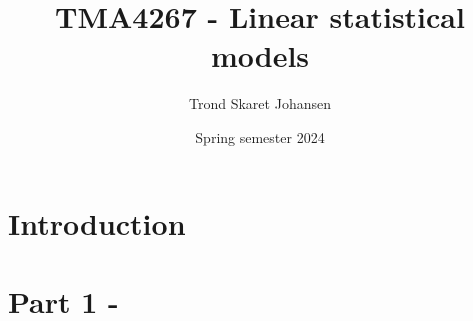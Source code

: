 \documentclass[12pt, letterpaper]{article}
\title{TMA4267 - Linear statistical models}
\date{Spring semester 2024}
\author{Trond Skaret Johansen}
\begin{document}
\maketitle
\tableofcontents
\newpage

\section{Introduction} 

\label{sec:introduction}


\newpage

\newpage
\section{Part 1 - }
\label{sec:P1}


% 

% 

% 

% 

% 


\newpage\printbibliography{}
\newpage\printindex{}
\end{document}
